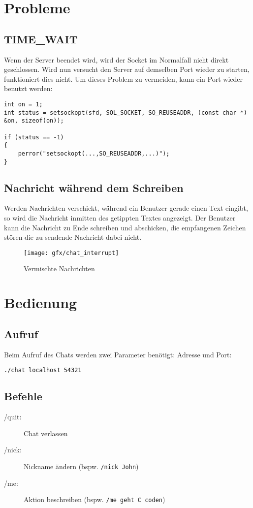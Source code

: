 \documentclass[a4paper]{article}
\begin{document}
\section{Probleme}
\subsection{TIME\_WAIT}
Wenn der Server beendet wird, wird der Socket im Normalfall nicht direkt geschlossen. Wird nun versucht den Server auf demselben Port wieder zu starten, funktioniert dies nicht. Um dieses Problem zu vermeiden, kann ein Port wieder benutzt werden:

\begin{verbatim}
int on = 1;
int status = setsockopt(sfd, SOL_SOCKET, SO_REUSEADDR, (const char *) &on, sizeof(on));

if (status == -1) 
{   
    perror("setsockopt(...,SO_REUSEADDR,...)");
}
\end{verbatim}

\subsection{Nachricht während dem Schreiben}
Werden Nachrichten verschickt, während ein Benutzer gerade einen Text eingibt, so wird die Nachricht inmitten des getippten Textes angezeigt. Der Benutzer kann die Nachricht zu Ende schreiben und abschicken, die empfangenen Zeichen stören die zu sendende Nachricht dabei nicht.

\begin{figure}[H]
    \centering
    \texttt{[image: gfx/chat\_interrupt]}
    \caption{Vermischte Nachrichten}
    \label{img:chat_interrupt}
\end{figure}

\section{Bedienung}
\subsection{Aufruf}
Beim Aufruf des Chats werden zwei Parameter benötigt: Adresse und Port:

\texttt{./chat localhost 54321}

\subsection{Befehle}

\begin{description}
    \item[/quit:] Chat verlassen
    \item[/nick:] Nickname ändern (bspw. \texttt{/nick John})
    \item[/me:] Aktion beschreiben (bspw. \texttt{/me geht C coden})
\end{description}
\end{document}
